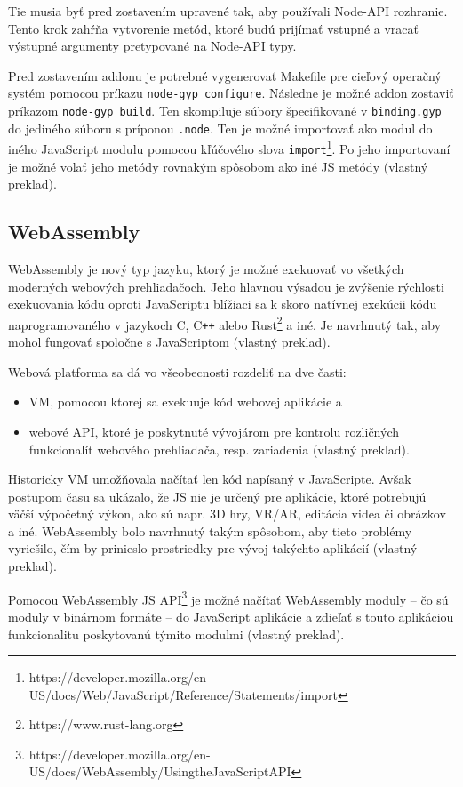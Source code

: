 Tie musia byť pred zostavením upravené tak, aby používali Node-API rozhranie. Tento krok zahŕňa vytvorenie metód, ktoré budú prijímať vstupné a vracať výstupné argumenty pretypované na Node-API typy.

Pred zostavením addonu je potrebné vygenerovať Makefile pre cieľový operačný systém pomocou príkazu \texttt{node-gyp configure}. Následne je možné addon zostaviť príkazom \texttt{node-gyp build}. Ten skompiluje súbory špecifikované v \texttt{binding.gyp} do jediného súboru s príponou \texttt{.node}. Ten je možné importovať ako modul do iného JavaScript modulu pomocou kľúčového slova \texttt{import}\footnote{https://developer.mozilla.org/en-US/docs/Web/JavaScript/Reference/Statements/import}. Po jeho importovaní je možné volať jeho metódy rovnakým spôsobom ako iné JS metódy \cite{cpp_addons} (vlastný preklad).

\subsection {WebAssembly}
WebAssembly je nový typ jazyku, ktorý je možné exekuovať vo všetkých moderných webových prehliadačoch. Jeho hlavnou výsadou je zvýšenie rýchlosti exekuovania kódu oproti JavaScriptu blížiaci sa k skoro natívnej exekúcii kódu naprogramovaného v jazykoch C, C\texttt{++} alebo Rust\footnote{https://www.rust-lang.org} a iné. Je navrhnutý tak, aby mohol fungovať spoločne s JavaScriptom \cite{webassembly_concepts} (vlastný preklad).

\clearpage

Webová platforma sa dá vo všeobecnosti rozdeliť na dve časti:
\begin{itemize}
\item {VM, pomocou ktorej sa exekuuje kód webovej aplikácie a}
\item {webové API, ktoré je poskytnuté vývojárom pre kontrolu rozličných funkcionalít webového prehliadača, resp. zariadenia  \cite{webassembly_concepts} (vlastný preklad).}
\end{itemize}

Historicky VM umožňovala načítať len kód napísaný v JavaScripte. Avšak postupom času sa ukázalo, že JS nie je určený pre aplikácie, ktoré potrebujú väčší výpočetný výkon, ako sú napr. 3D hry, VR/AR, editácia videa či obrázkov a iné.
WebAssembly bolo navrhnutý takým spôsobom, aby tieto problémy vyriešilo, čím by prinieslo prostriedky pre vývoj takýchto aplikácií \cite{webassembly_concepts} (vlastný preklad). 

Pomocou WebAssembly JS API\footnote{https://developer.mozilla.org/en-US/docs/WebAssembly/Using\textunderscore the\textunderscore JavaScript\textunderscore API} je možné načítať WebAssembly moduly -- čo sú moduly v binárnom formáte -- do JavaScript aplikácie a zdieľať s touto aplikáciou funkcionalitu poskytovanú týmito modulmi \cite{webassembly_concepts} (vlastný preklad).

